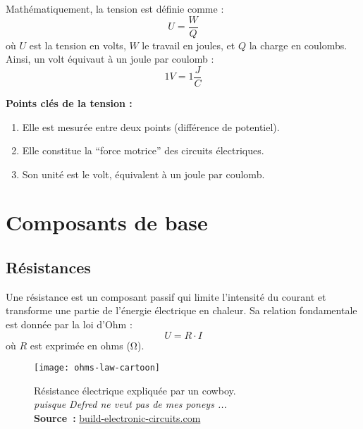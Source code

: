Math\'ematiquement, la tension est d\'efinie comme :
\[
  U = \frac{W}{Q}
\]
où \(U\) est la tension en volts, \(W\) le travail en joules, et \(Q\) la charge
en coulombs. Ainsi, un volt \'equivaut à un joule par coulomb :
\[
1V=1\frac{J}{C}
\]


\vspace{\baselineskip}
\begin{Note}
\textbf{Points cl\'es de la tension :}
\begin{enumerate}
  \item Elle est mesur\'ee entre deux points (diff\'erence de potentiel).
  \item Elle constitue la “force motrice” des circuits \'electriques.
  \item Son unit\'e est le volt, \'equivalent à un joule par coulomb.
\end{enumerate}
\end{Note}


\section{Composants de base} \label{subsec:basic_components}
\subsection{R\'esistances} \label{subsec:resistors}
Une r\'esistance est un composant passif qui limite l’intensit\'e du courant
et transforme une partie de l’\'energie \'electrique en chaleur.
Sa relation fondamentale est donn\'ee par la loi d’Ohm :
\[
U = R \cdot I
\]
où \(R\) est exprim\'ee en ohms (\unit{\ohm}).

\begin{figure}[H]
    \centering
    \texttt{[image: ohms-law-cartoon]}
    \caption{
        \centering
        R\'esistance \'electrique expliqu\'ee par un cowboy. \\\emph{puisque Defred ne veut pas de mes poneys ...}\\
        \textbf{Source~:}
        \href{https://build-electronic-circuits.com/ohms-law}{build-electronic-circuits.com}
    }

\end{figure}



